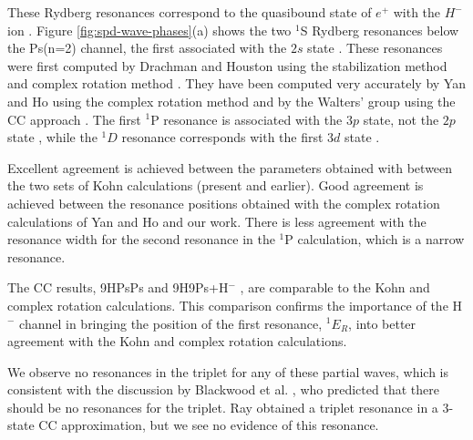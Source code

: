 \documentclass[reprint,showpacs,preprintnumbers,amsmath,amssymb,pra,aps]{revtex4-1}
\begin{document}
These Rydberg resonances correspond to the quasibound state of $e^+$ with the $H^-$ ion \cite{Drachman1979}.
Figure \ref{fig:spd-wave-phases}(a) shows the two $^1$S Rydberg resonances below the
Ps(n=2) channel, the first associated with the $2s$ state \cite{DiRienzi2002b}.
These resonances were first computed by Drachman and Houston using the stabilization
method and complex rotation method \cite{Drachman1975}. They have been computed very accurately by Yan and Ho
using the complex rotation method \cite{Yan1999} and by the Walters' group using the CC approach \cite{Walters2004}. The first $^1$P resonance is associated with the $3p$ state, not the $2p$ state \cite{DiRienzi2002b}, while the $^1D$ resonance corresponds with the first $3d$ state \cite{DiRienzi2002a}.

Excellent agreement is achieved between the parameters obtained with between the two sets of Kohn calculations (present and earlier). Good agreement is achieved between the resonance positions obtained with the complex rotation calculations of Yan and Ho \cite{Yan1999,Yan1998a,Ho1998,Ho2000} and our work. There is less agreement with the resonance width for the second resonance in the $^1$P calculation, which is a narrow resonance. 

The CC results, 9HPsPs \cite{Blackwood2002} and 9H9Ps+H$^-$ \cite{Walters2004}, are comparable to the Kohn and complex rotation calculations. This comparison confirms the importance of the H$^-$ channel in bringing the position of the first resonance, $^1E_R$, into better agreement with the Kohn and complex rotation calculations.

We observe no resonances in the triplet for any of these partial waves, which is consistent with the discussion by Blackwood et al. \cite{Blackwood2002}, who predicted that there should be no resonances for the triplet. Ray \cite{Ray2006} obtained a triplet resonance in a 3-state CC approximation, but we see no evidence of this resonance.
\end{document}
